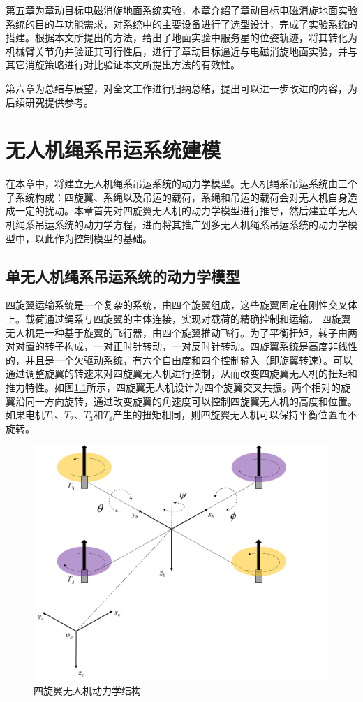 \documentclass[lang=chs, degree=master, blindreview=false, winfonts=true]{yanputhesis}
\begin{document}
第五章为章动目标电磁消旋地面系统实验，本章介绍了章动目标电磁消旋地面实验系统的目的与功能需求，对系统中的主要设备进行了选型设计，完成了实验系统的搭建。根据本文所提出的方法，给出了地面实验中服务星的位姿轨迹，将其转化为机械臂关节角并验证其可行性后，进行了章动目标逼近与电磁消旋地面实验，并与其它消旋策略进行对比验证本文所提出方法的有效性。

第六章为总结与展望，对全文工作进行归纳总结，提出可以进一步改进的内容，为后续研究提供参考。



\cleardoublepage

\chapter{无人机绳系吊运系统建模}
在本章中，将建立无人机绳系吊运系统的动力学模型。无人机绳系吊运系统由三个子系统构成：四旋翼、系绳以及吊运的载荷，系绳和吊运的载荷会对无人机自身造成一定的扰动。本章首先对四旋翼无人机的动力学模型进行推导，然后建立单无人机绳系吊运系统的动力学方程，进而将其推广到多无人机绳系吊运系统的动力学模型中，以此作为控制模型的基础。

\section{单无人机绳系吊运系统的动力学模型}
四旋翼运输系统是一个复杂的系统，由四个旋翼组成，这些旋翼固定在刚性交叉体上。载荷通过绳系与四旋翼的主体连接，实现对载荷的精确控制和运输。
四旋翼无人机是一种基于旋翼的飞行器，由四个旋翼推动飞行。为了平衡扭矩，转子由两对对置的转子构成，一对正时针转动，一对反时针转动。四旋翼系统是高度非线性的，并且是一个欠驱动系统，有六个自由度和四个控制输入（即旋翼转速）。可以通过调整旋翼的转速来对四旋翼无人机进行控制，从而改变四旋翼无人机的扭矩和推力特性。如图\ref{2_1}所示，四旋翼无人机设计为四个旋翼交叉共振。两个相对的旋翼沿同一方向旋转，通过改变旋翼的角速度可以控制四旋翼无人机的高度和位置。如果电机$T_1$、$T_2$、$T_3$和$T_4$产生的扭矩相同，则四旋翼无人机可以保持平衡位置而不旋转。

\begin{figure}[hbt!]
	\centering
	\includegraphics[width=28pc]{picture/2_1.png} 
	\caption{四旋翼无人机动力学结构} \label{2_1}
\end{figure}
\end{document}
